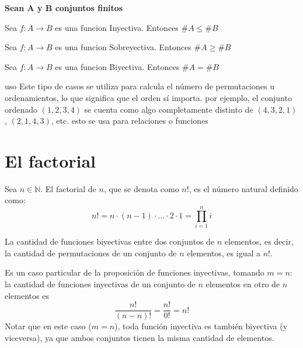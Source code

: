\begin{teoria}[title= Cardinales y Funciones]
    \textbf{Sean A y B conjuntos finitos}
        \begin{listapropiedades}
  \item[1] Sea $f: A\rightarrow B$ es una funcion Inyectiva. Entonces $\#A \leq \#B$
  \item[2] Sea $f: A\rightarrow B$ es una funcion Sobreyectiva. Entonces $\#A \geq \#B$
  \item[3] Sea $f: A\rightarrow B$ es una funcion Biyectiva. Entonces $\#A = \#B$
    \end{listapropiedades}
\end{teoria}

\begin{nota}{uso}
    Este tipo de casos se utiliza para calcula el número de permutaciones u ordenamientos, lo que significa que el orden sí importa.
    por ejemplo, el conjunto ordenado $(1, 2, 3, 4)$ se cuenta como algo completamente distinto de $(4, 3, 2, 1)$, $(2, 1, 4, 3)$, etc.
    esto se usa para relaciones o funciones
\end{nota}

\section{El factorial}

\begin{definicion}[title={Definición de Factorial}]
    Sea $n \in \mathbb{N}$. El factorial de $n$, que se denota como $n!$, es el número natural definido como:
    \[
    n! = n \cdot (n-1) \cdot \dots \cdot 2 \cdot 1 = \prod_{i=1}^{n} i
    \]
\end{definicion}

\begin{proposicion}[title=Factorial y permutaciones]
    La cantidad de funciones biyectivas entre dos conjuntos de $n$ elementos, es decir, la cantidad de permutaciones de un conjunto de $n$ elementos, es igual a $n!$.
\end{proposicion}

\begin{demostracion}
    Es un caso particular de la proposición de funciones inyectivas, tomando $m=n$: la cantidad de funciones inyectivas de un conjunto de $n$ elementos en otro de $n$ elementos es
    \[
    \frac{n!}{(n-n)!} = \frac{n!}{0!} = n!
    \]
    Notar que en este caso ($m=n$), toda función inyectiva es también biyectiva (y viceversa), ya que ambos conjuntos tienen la misma cantidad de elementos.
\end{demostracion}

